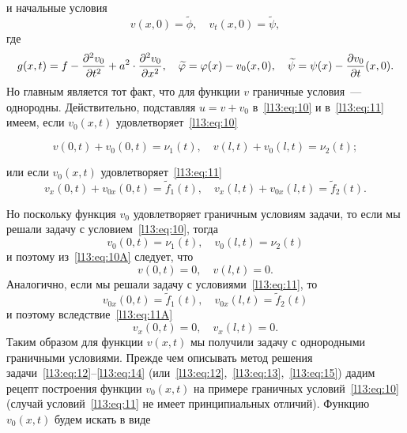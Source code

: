 и начальные условия
\begin{equation}\label{l13:eq:13}
	 v(x,0)=\widetilde{\phi},\quad v_t(x,0)=\widetilde{\psi},
\end{equation}
где 
\begin{equation*}
	g(x,t)=f-\frac{\partial^2v_0}{\partial t^2}+a^2\cdot\frac{\partial^2v_0}{\partial x^2},\quad \widetilde{\varphi}=\varphi(x)-v_0(x,0),\quad\widetilde{\psi}=\psi(x)-\frac{\partial v_0}{\partial t}(x,0).
\end{equation*}
Но главным является тот факт, что для функции $v$ граничные условия~--- однородны. Действительно, подставляя $u=v+v_0$ в~\eqref{l13:eq:10} и в~\eqref{l13:eq:11} имеем, если $v_0(x,t)$ удовлетворяет~\eqref{l13:eq:10}\addtocounter{equation}{-3}%
\begin{equation}\label{l13:eq:10A}
	 v(0,t)+v_0(0,t)=\nu_1(t),\quad v(l,t)+v_0(l,t)=\nu_2(t);\tag{\theequation A}
\end{equation}\addtocounter{equation}{1}%
или если $v_0(x,t)$ удовлетворяет~\eqref{l13:eq:11}
\begin{equation}\label{l13:eq:11A}
	 v_x(0,t)+v_{0x}(0,t)=\widetilde{f}_1(t),\quad v_x(l,t)+v_{0x}(l,t)=\widetilde{f}_2(t).\tag{\theequation A}
\end{equation}\addtocounter{equation}{2}%
Но поскольку функция $v_0$ удовлетворяет граничным условиям задачи, то если мы решали задачу с условием~\eqref{l13:eq:10}, тогда
\begin{equation*}
	 v_0(0,t)=\nu_1(t),\quad v_0(l,t)=\nu_2(t)
\end{equation*} 
и поэтому из~\eqref{l13:eq:10A} следует, что
\begin{equation}\label{l13:eq:14}
	 v(0,t)=0,\quad v(l,t)=0.
\end{equation}
Аналогично, если мы решали задачу с условиями~\eqref{l13:eq:11}, то 
\begin{equation*}
	 v_{0x}(0,t)=\widetilde{f}_1(t),\quad v_{0x}(l,t)=\widetilde{f}_2(t)
\end{equation*} 
и поэтому вследствие~\eqref{l13:eq:11A} 
\begin{equation}\label{l13:eq:15}
	 v_x(0,t)=0,\quad v_x(l,t)=0.
\end{equation}
Таким образом для функции $v(x,t)$ мы получили задачу с однородными граничными условиями. Прежде чем описывать метод решения задачи~\eqref{l13:eq:12}--\eqref{l13:eq:14} (или~\eqref{l13:eq:12},~\eqref{l13:eq:13},~\eqref{l13:eq:15}) дадим рецепт построения функции $v_0(x,t)$ на примере граничных условий~\eqref{l13:eq:10} (случай условий~\eqref{l13:eq:11} не имеет принципиальных отличий). Функцию $v_0(x,t)$ будем искать в виде
